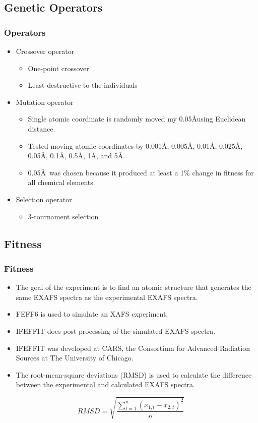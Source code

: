 \documentclass[10pt]{beamer}
\begin{document}
\subsection{Genetic Operators}

\begin{frame}
	\frametitle{Operators}

	\begin{itemize}
		\item Crossover operator
			\begin{itemize}
				\item One-point crossover
				\item Least destructive to the individuals
			\end{itemize}
		\item Mutation operator
			\begin{itemize}
				\item Single atomic coordinate is randomly moved my 0.05\AA using Euclidean distance.
				\item Tested moving atomic coordinates by 0.001\AA, 0.005\AA, 0.01\AA, 0.025\AA, 0.05\AA, 0.1\AA, 0.5\AA, 1\AA, and 5\AA.
				\item 0.05\AA\ was chosen because it produced at least a 1\% change in fitness for all chemical elements.
			\end{itemize}
		\item Selection operator
			\begin{itemize}
				\item 3-tournament selection
			\end{itemize}
	\end{itemize}

\end{frame}

\subsection{Fitness}

\begin{frame}
	\frametitle{Fitness}

	\begin{itemize}
		\item The goal of the experiment is to find an atomic structure that generates the same EXAFS spectra as the experimental EXAFS spectra.
		\item FEFF6 is used to simulate an XAFS experiment.
		\item IFEFFIT does post processing of the simulated EXAFS spectra.
		\item IFEFFIT was developed at CARS, the Consortium for Advanced Radiation Sources at The University of Chicago.
		\item The root-mean-square deviations (RMSD) is used to calculate the difference between the experimental and calculated EXAFS spectra.
	\end{itemize}

	\begin{equation}
		RMSD = \sqrt{\frac{\sum_{t=1}^{n} \left ( x_{1,t}-x_{2,t} \right )^{2}}{n}}
	\end{equation}

\end{frame}
\end{document}
